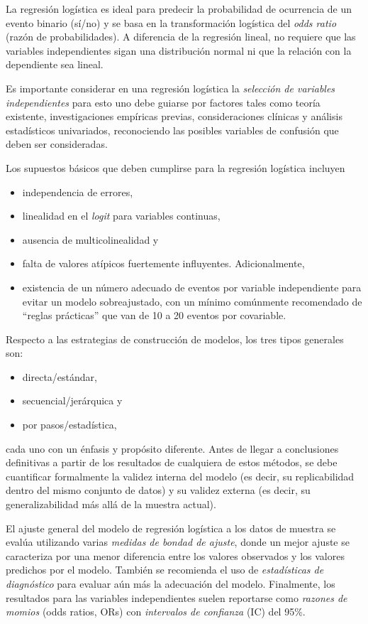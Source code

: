 \documentclass[12pt]{article}
\begin{document}
La regresi\'on log\'istica es ideal para predecir la probabilidad de ocurrencia de un evento binario (s\'i/no) y se basa en la transformaci\'on log\'istica del \textit{odds ratio} (raz\'on de probabilidades). A diferencia de la regresi\'on lineal, no requiere que las variables independientes sigan una distribuci\'on normal ni que la relaci\'on con la dependiente sea lineal.

Es importante considerar en una regresi\'on log\'istica la \textit{selecci\'on de variables independientes} para esto uno debe guiarse por factores tales como teor\'ia existente, investigaciones emp\'iricas previas, consideraciones cl\'inicas y an\'alisis estad\'isticos univariados, reconociendo las posibles variables de confusi\'on que deben ser consideradas. 

Los supuestos b\'asicos que deben cumplirse para la regresi\'on log\'istica incluyen
\begin{itemize}
\item independencia de errores, 
\item linealidad en el \textit{logit} para variables continuas, 
\item ausencia de multicolinealidad y 
\item falta de valores at\'ipicos fuertemente influyentes. Adicionalmente, 
\item existencia de un n\'umero adecuado de eventos por variable independiente para evitar un modelo sobreajustado, con un m\'inimo com\'unmente recomendado de “reglas pr\'acticas” que van de 10 a 20 eventos por covariable.
\end{itemize}

Respecto a las estrategias de construcci\'on de modelos, los tres tipos generales son: 
\begin{itemize}
\item directa/est\'andar, 
\item secuencial/jer\'arquica y 
\item por pasos/estad\'istica,
\end{itemize}
cada uno con un \'enfasis y prop\'osito diferente. Antes de llegar a conclusiones definitivas a partir de los resultados de cualquiera de estos m\'etodos, se debe cuantificar formalmente la validez interna del modelo (es decir, su replicabilidad dentro del mismo conjunto de datos) y su validez externa (es decir, su generalizabilidad m\'as all\'a de la muestra actual).

El ajuste general del modelo de regresi\'on log\'istica a los datos de muestra se eval\'ua utilizando varias \textit{medidas de bondad de ajuste}, donde un mejor ajuste se caracteriza por una menor diferencia entre los valores observados y los valores predichos por el modelo. Tambi\'en se recomienda el uso de \textit{estad\'isticas de diagn\'ostico} para evaluar a\'un m\'as la adecuaci\'on del modelo. Finalmente, los resultados para las variables independientes suelen reportarse como \textit{razones de momios} (odds ratios, ORs) con \textit{intervalos de confianza} (IC) del 95\%.
\end{document}
